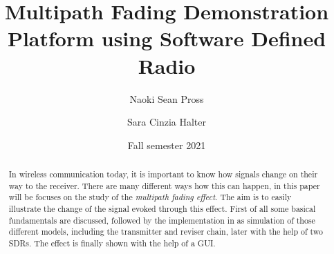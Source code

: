 \documentclass[
	overfullrule,
	paper = a4, twoside, openright, BCOR = 5mm,
	headinclude, footexclude,
	fontsize = 11pt,
	cleardoublepage = empty,
	titlepage, abstract = on,
	automark,
	numbers = noenddot
]{scrreprt}
\title{Multipath Fading Demonstration Platform using Software Defined Radio}
\author{Naoki Sean Pross \and Sara Cinzia Halter}
\date{Fall semester 2021}
\begin{document}
	\hypersetup{pageanchor = false}

	\maketitle

	\begin{abstract}
				
		In wireless communication today, it is important to know how signals change on their way to the receiver. There are many different ways how this can happen, in this paper will be focuses on the study of the \emph{multipath fading effect}. The aim is to easily illustrate the change of the signal evoked through this effect. 
		First of all some basical fundamentals are discussed, followed by the implementation in as simulation of those different models, including the transmitter and reviser chain, later with the help of two SDRs.
		The effect is finally shown with the help of a GUI. 
	 
	
		\skelpar
	\end{abstract}

	\cleardoublepage
	\setcounter{page}{1}

	\tableofcontents
	\cleardoublepage

\end{document}
